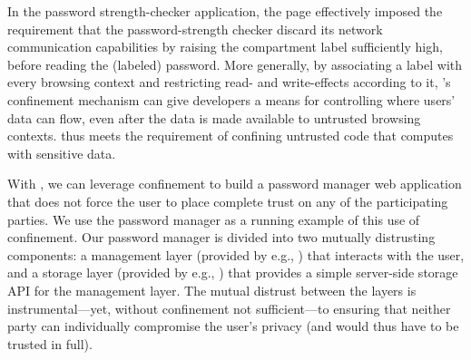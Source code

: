 In the password strength-checker application, the 
page effectively imposed the requirement that the password-strength
checker discard its network communication capabilities by raising the
compartment label sufficiently high, before reading the (labeled)
password.
%
More generally, by associating a label with every browsing context and
restricting read- and write-effects according to it, \sys{}'s
confinement mechanism can give developers a means for controlling
where users' data can flow, even after the data is made available to
untrusted browsing contexts. \sys{} thus meets the requirement of
confining untrusted code that computes with sensitive data.

%
With \sys{}, we can leverage confinement to build a password manager
web application that does not force the user to place complete trust on 
any of the participating parties. We use the password manager as a
running example of this use of confinement.
%
Our password manager is divided into two mutually distrusting
components: a management layer (provided by e.g., )
that interacts with the user, 
and a storage layer (provided by e.g., ) that provides a
simple
server-side storage API for the
management layer.
%
The mutual distrust between the layers is instrumental---yet, without
confinement not sufficient---to ensuring that neither party can
individually compromise the user's privacy (and would thus have to be
trusted in full).
%

